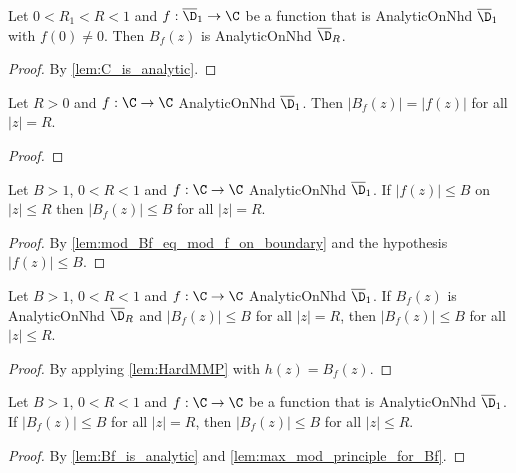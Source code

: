 \begin{lemma}[B analytic]\label{lem:Bf_is_analytic}  \leanok
Let $0<R_1<R<1$ and $f:\overline{\D}_1\to\C$ be a function that is AnalyticOnNhd $\overline{\D}_1$ with $f(0)\neq0$. Then $B_f(z)$ is AnalyticOnNhd $\overline{\D}_R$.
\end{lemma}
\begin{proof}
\leanok
By \cref{lem:C_is_analytic}.
\end{proof}

\begin{lemma}\label{lem:mod_Bf_eq_mod_f_on_boundary}  \leanok
Let $R>0$ and $f:\C\to\C$ AnalyticOnNhd $\overline{\D}_1$. Then $|B_f(z)|=|f(z)|$ for all $|z|=R$.
\end{lemma}
\begin{proof}
\leanok
\end{proof}

\begin{lemma}\label{lem:Bf_bounded_on_boundary}  \leanok
Let $B>1$, $0<R<1$ and $f:\C\to\C$ AnalyticOnNhd $\overline{\D}_1$. If $|f(z)|\le B$ on $|z|\le R$ then $|B_f(z)|\le B$ for all $|z|=R$.
\end{lemma}
\begin{proof} \leanok
{}
By \cref{lem:mod_Bf_eq_mod_f_on_boundary} and the hypothesis $|f(z)| \le B$.
\end{proof}


\begin{lemma}\label{lem:max_mod_principle_for_Bf}  \leanok
Let $B>1$, $0<R<1$ and $f:\C\to\C$ AnalyticOnNhd $\overline{\D}_1$. If $B_f(z)$ is AnalyticOnNhd $\overline{\D}_R$ and $|B_f(z)|\le B$ for all $|z|=R$, then $|B_f(z)|\le B$ for all $|z|\le R$.
\end{lemma}
\begin{proof} \leanok
{}
By applying \cref{lem:HardMMP} with $h(z)=B_f(z)$.
\end{proof}

\begin{lemma}\label{lem:Bf_bounded_in_disk_from_boundary}  \leanok
Let $B>1$, $0<R<1$ and $f:\C\to\C$ be a function that is AnalyticOnNhd $\overline{\D}_1$. If $|B_f(z)|\le B$ for all $|z|=R$, then $|B_f(z)|\le B$ for all $|z|\le R$.
\end{lemma}
\begin{proof} \leanok
{}
By \cref{lem:Bf_is_analytic} and \cref{lem:max_mod_principle_for_Bf}.
\end{proof}

